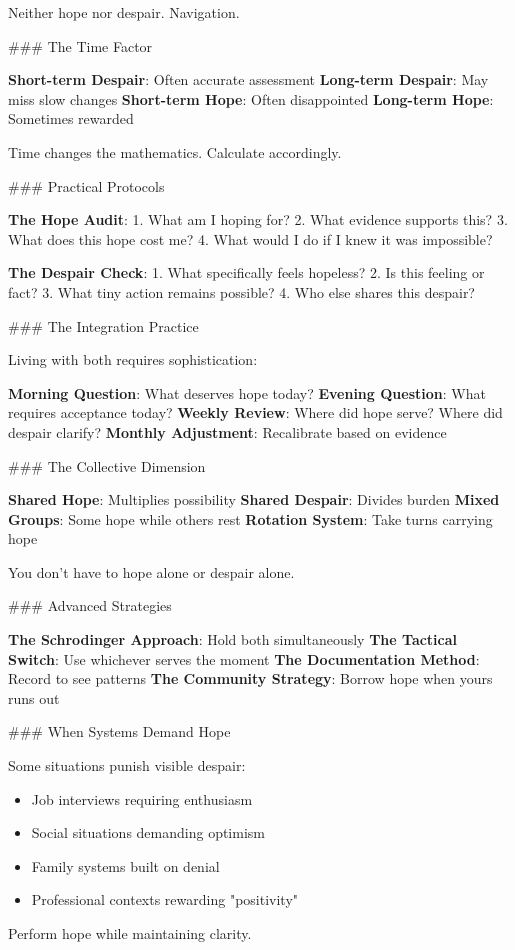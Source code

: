 \documentclass[12pt]{book}
\begin{document}
Neither hope nor despair. Navigation.

\#\#\# The Time Factor

\textbf{Short-term Despair}: Often accurate assessment
\textbf{Long-term Despair}: May miss slow changes
\textbf{Short-term Hope}: Often disappointed
\textbf{Long-term Hope}: Sometimes rewarded

Time changes the mathematics. Calculate accordingly.

\#\#\# Practical Protocols

\textbf{The Hope Audit}:
1. What am I hoping for?
2. What evidence supports this?
3. What does this hope cost me?
4. What would I do if I knew it was impossible?

\textbf{The Despair Check}:
1. What specifically feels hopeless?
2. Is this feeling or fact?
3. What tiny action remains possible?
4. Who else shares this despair?

\#\#\# The Integration Practice

Living with both requires sophistication:

\textbf{Morning Question}: What deserves hope today?
\textbf{Evening Question}: What requires acceptance today?
\textbf{Weekly Review}: Where did hope serve? Where did despair clarify?
\textbf{Monthly Adjustment}: Recalibrate based on evidence

\#\#\# The Collective Dimension

\textbf{Shared Hope}: Multiplies possibility
\textbf{Shared Despair}: Divides burden
\textbf{Mixed Groups}: Some hope while others rest
\textbf{Rotation System}: Take turns carrying hope

You don't have to hope alone or despair alone.

\#\#\# Advanced Strategies

\textbf{The Schrodinger Approach}: Hold both simultaneously
\textbf{The Tactical Switch}: Use whichever serves the moment
\textbf{The Documentation Method}: Record to see patterns
\textbf{The Community Strategy}: Borrow hope when yours runs out

\#\#\# When Systems Demand Hope

Some situations punish visible despair:

\begin{itemize}
\item Job interviews requiring enthusiasm
\item Social situations demanding optimism  
\item Family systems built on denial
\item Professional contexts rewarding "positivity"

\end{itemize}
Perform hope while maintaining clarity.
\end{document}
